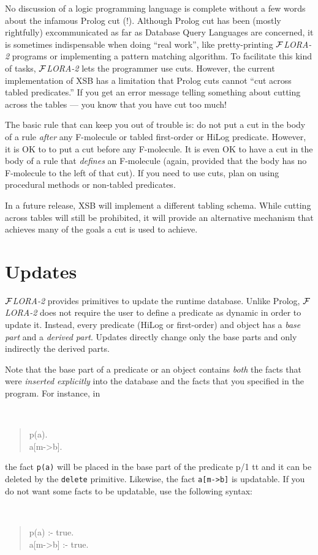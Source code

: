 \documentclass[11pt]{article}
\newcommand{\FLORA}{{\mbox{${\cal F}${\small\it LORA}\rm\emph{-2}}}\xspace}
\begin{document}
\index{cuts in \FLORA}
No discussion of a logic programming language is complete without a few
words about the infamous Prolog cut (!). Although Prolog cut has been
(mostly rightfully) excommunicated as far as Database Query Languages are
concerned, it is sometimes indispensable when doing ``real work'', like
pretty-printing \FLORA programs or implementing a pattern matching
algorithm.  To facilitate this kind of tasks, \FLORA lets the programmer
use cuts.  However, the current implementation of XSB has a limitation that
Prolog cuts cannot ``cut across tabled predicates.''  If you get an error
message telling something about cutting across the tables --- you know that
you have cut too much!

The basic rule that can keep you out of trouble is: do not put a cut in the
body of a rule \emph{after} any F-molecule or tabled first-order or HiLog
predicate. However, it is OK to to put a cut before any F-molecule. It is
even OK to have a cut in the body of a rule that \emph{defines} an
F-molecule (again, provided that the body has no F-molecule to the left of
that cut). If you need to use cuts, plan on using procedural methods or
non-tabled predicates.

In a future release, XSB will implement a different tabling schema. While
cutting across tables will still be prohibited, it will provide an
alternative mechanism that achieves many of the goals a cut is used to
achieve.


\section{Updates}\label{sec-updates}


%
\FLORA provides primitives to update the runtime database. Unlike Prolog,
\FLORA does not require the user to define a predicate as dynamic in order
to update it. Instead, every predicate (HiLog or first-order) and object
has a \emph{base part} and a \emph{derived part}.  Updates directly change
only the base parts and only indirectly the derived parts.

Note that the base part of a predicate or an object contains \emph{both}
the facts that were \emph{inserted explicitly} into the database and the
facts that you specified in the program. For instance, in
{\tt
\begin{quote}
 p(a).\\
 a[m->b].
\end{quote}
}
\noindent
the fact {\tt p(a)} will be placed in the base part of the predicate p/1 tt
and it can be deleted by the {\tt delete} primitive. Likewise,
the fact {\tt a[m->b]} is updatable. If you do not want
some facts to be updatable, use the following syntax:
{\tt
\begin{quote}
 p(a) :- true.\\
 a[m->b] :- true.
\end{quote}
}
\end{document}
